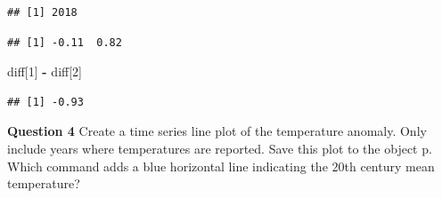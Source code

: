 \documentclass[
]{article}
\newenvironment{Shaded}{\begin{snugshade}}{\end{snugshade}}
\newcommand{\CommentTok}[1]{\textcolor[rgb]{0.56,0.35,0.01}{\textit{#1}}}
\newcommand{\DataTypeTok}[1]{\textcolor[rgb]{0.13,0.29,0.53}{#1}}
\newcommand{\DecValTok}[1]{\textcolor[rgb]{0.00,0.00,0.81}{#1}}
\newcommand{\KeywordTok}[1]{\textcolor[rgb]{0.13,0.29,0.53}{\textbf{#1}}}
\newcommand{\NormalTok}[1]{#1}
\newcommand{\OperatorTok}[1]{\textcolor[rgb]{0.81,0.36,0.00}{\textbf{#1}}}
\newcommand{\StringTok}[1]{\textcolor[rgb]{0.31,0.60,0.02}{#1}}
\begin{document}
\begin{verbatim}
## [1] 2018
\end{verbatim}

\begin{Shaded}
\end{Shaded}

\begin{verbatim}
## [1] -0.11  0.82
\end{verbatim}

\begin{Shaded}
\begin{Highlighting}[]
\NormalTok{diff[}\DecValTok{1}\NormalTok{] }\OperatorTok{-}\StringTok{ }\NormalTok{diff[}\DecValTok{2}\NormalTok{]}
\end{Highlighting}
\end{Shaded}

\begin{verbatim}
## [1] -0.93
\end{verbatim}

\textbf{Question 4} Create a time series line plot of the temperature
anomaly. Only include years where temperatures are reported. Save this
plot to the object p.\\
Which command adds a blue horizontal line indicating the 20th century
mean temperature?

\begin{Shaded}
\end{Shaded}
\end{document}
